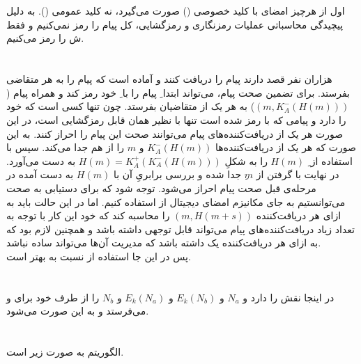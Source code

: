 \documentclass{article}
\begin{document}
\section{}
اول از هرچیز امضای  با کلید خصوصی () صورت می‌گیرد، نه کلید عمومی (). به دلیل پیچیدگی محاسباتی عملیات رمزنگاری و رمزگشایی، کل پیام را رمز نمی‌کنیم و فقط ش را رمز می‌کنیم.

\section{}
هزاران نفر قصد دارند پیام  را دریافت کنند و  آماده است که پیام را به هر متقاضی بفرستد. برای تضمین صحت پیام،  می‌تواند ابتدا ِ پیام را با ِ خود رمز کند و همراه پیام
($(m, K_{A}^{-}(H(m)))$)
به هر یک از متقاضیان بفرستد. چون  تنها کسی است که  خود را دارد و پیامی که با  رمز شده است تنها با  نظیر همان  قابل رمزگشایی است، در این صورت هر یک از دریافت‌کننده‌های پیام می‌توانند صحت این پیام را احراز کنند. به این صورت که هر یک از دریافت‌کننده‌ها $K_{A}^{-}(H(m))$ و $m$ را از هم جدا می‌کند. سپس با استفاده از ِ  $H(m)$ را به شکلِ
$H(m) = K_{A}^{+}(K_{A}^{-}(H(m)))$
به دست می‌آورد. در نهایت با گرفتن  از $m$ِ جدا شده و بررسی برابریِ آن با $H(m)$ به دست آمده در مرحله‌ی قبل صحت پیام احراز می‌شود. توجه شود که برای دستیابی به صحت می‌توانستیم به جای مکانیزم امضای دیجیتال از  استفاده کنیم. اما در این حالت  باید به ازای هر دریافت‌کننده
$(m, H(m + s))$
را محاسبه کند که خود این کار با توجه به تعداد زیاد دریافت‌کننده‌های پیام می‌تواند  قابل توجهی داشته باشد و همچنین لازم بود که به ازای هر دریافت‌کننده یک  داشته باشد که مدیریت آن‌ها می‌تواند ساده نباشد. \\
پس در این جا استفاده از  نسبت به  بهتر است.


\section{}
در اینجا  نقش  را دارد و $N_a$ و $E_k(N_b)$ و $E_k(N_a)$ و $N_b$ را از طرف خود برای  و  می‌فرستد و به این صورت  می‌شود.




\section{}
الگوریتم  به صورت زیر است.
\end{document}
